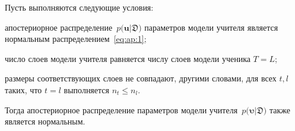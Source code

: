 \documentclass[12pt]{a&t}
\begin{document}
\begin{theorem}
\label{theorem:ap:neural}
Пусть выполняются следующие условия:
\begin{enumlist}
\item апостериорное распределение~$p\bigr(\mathbf{u}|\mathfrak{D}\bigr)$ параметров модели учителя является нормальным распределением~\eqref{eq:ap:1};
\item число слоев модели учителя равняется числу слоев модели ученика $T=L$;
\item размеры соответствующих слоев не совпадают, другими словами, для всех $t, l$ таких, что $t=l$ выполняется $n_t \leq n_l.$
\end{enumlist}
Тогда апостериорное распределение параметров модели учителя~$p\bigr(\bm{\upsilon}|\mathfrak{D}\bigr)$ также является нормальным.
\end{theorem}
\end{document}
